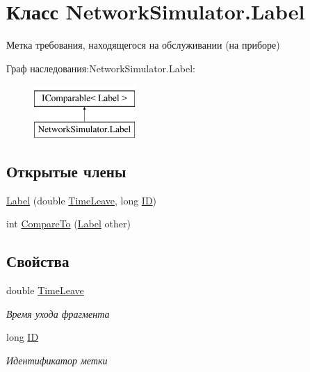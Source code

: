 \hypertarget{class_network_simulator_1_1_label}{}\section{Класс Network\+Simulator.\+Label}
\label{class_network_simulator_1_1_label}


Метка требования, находящегося на обслуживании (на приборе)  


Граф наследования\+:Network\+Simulator.\+Label\+:\begin{figure}[H]
\begin{center}
\leavevmode
\includegraphics[height=2.000000cm]{class_network_simulator_1_1_label}
\end{center}
\end{figure}
\subsection*{Открытые члены}
\begin{DoxyCompactItemize}
\item 
\hyperlink{class_network_simulator_1_1_label_ad26a187810d4efe2e7ad863fce2d2797}{Label} (double \hyperlink{class_network_simulator_1_1_label_a9b7cae531ffa9a0c7de7260635eaaf1e}{Time\+Leave}, long \hyperlink{class_network_simulator_1_1_label_a5f5343f77e75830c5ebc4168808f52d9}{ID})
\item 
int \hyperlink{class_network_simulator_1_1_label_ab875dff5a5f1d1f378c5560a67e70266}{Compare\+To} (\hyperlink{class_network_simulator_1_1_label}{Label} other)
\end{DoxyCompactItemize}
\subsection*{Свойства}
\begin{DoxyCompactItemize}
\item 
double \hyperlink{class_network_simulator_1_1_label_a9b7cae531ffa9a0c7de7260635eaaf1e}{Time\+Leave}
\begin{DoxyCompactList}\small\item\em Время ухода фрагмента \end{DoxyCompactList}\item 
long \hyperlink{class_network_simulator_1_1_label_a5f5343f77e75830c5ebc4168808f52d9}{ID}
\begin{DoxyCompactList}\small\item\em Идентификатор метки \end{DoxyCompactList}\end{DoxyCompactItemize}



